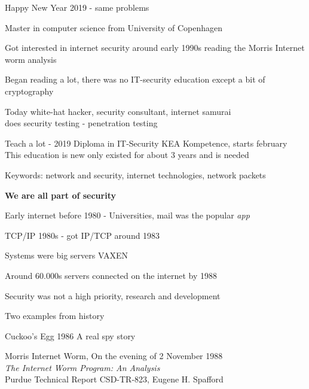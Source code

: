 \documentclass[Screen16to9,17pt,footrule]{foils}
\begin{document}

\centerline{Happy New Year 2019 - same problems}



\begin{list2}
\item Master in computer science from University of Copenhagen
\item Got interested in internet security around early 1990s reading the Morris Internet worm analysis
\item Began reading a lot, there was no IT-security education except a bit of cryptography
\item Today white-hat hacker, security consultant, internet samurai\\
does security testing - penetration testing
\item Teach a lot - 2019 Diploma in IT-Security KEA Kompetence, starts february\\This education is new only existed for about 3 years and is needed
\item Keywords: network and security, internet technologies, network packets
\end{list2}

\vskip 10mm
\centerline{\bf\Large We are all part of security}


\begin{list1}
\item Early internet before 1980 - Universities, mail was the popular \emph{app}
\item TCP/IP 1980s - got IP/TCP around 1983
\item Systems were big servers VAXEN
\item Around 60.000s servers connected on the internet by 1988
\item Security was not a high priority, research and development
\item Two examples from history
\vskip 1cm
\begin{list2}
\item Cuckoo's Egg 1986 A real spy story
\item Morris Internet Worm, On the evening of 2 November 1988\\
\emph{The Internet Worm Program: An Analysis}\\
Purdue Technical Report CSD-TR-823, Eugene H. Spafford
\end{list2}
\end{list1}
\end{document}
